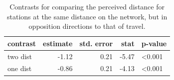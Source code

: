 \documentclass[
  11pt,
  letterpaper,
]{scrbook}
\theoremstyle{definition}
\theoremstyle{definition}
\theoremstyle{remark}
\begin{document}
\begin{longtable}[]{@{}lrrrl@{}}

\caption{\label{tbl-contrast-MP14}Contrasts for comparing the perceived
distance for stations at the same distance on the network, but in
opposition directions to that of travel.}

\tabularnewline

\toprule\noalign{}
contrast & estimate & std. error & stat & p-value \\
\midrule\noalign{}
\endhead
\bottomrule\noalign{}
\endlastfoot
two dist & -1.12 & 0.21 & -5.47 & \textless0.001 \\
one dist & -0.86 & 0.21 & -4.13 & \textless0.001 \\

\end{longtable}
\end{document}
